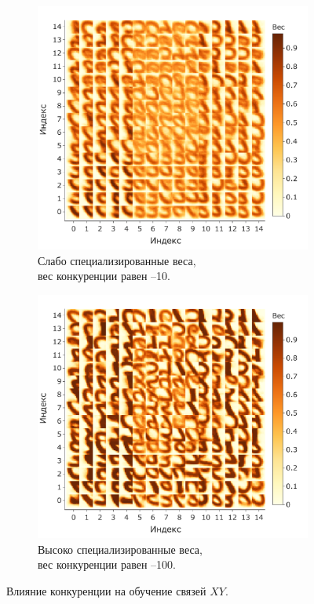 \documentclass[a4paper]{article}
\begin{document}
\begin{figure}[H]
\centering
\begin{subfigure}{0.45\textwidth}
    \includegraphics[width=\textwidth,keepaspectratio=true]{weights_XY_bad_ru.pdf}
    \caption{Слабо специализированные веса,\\ вес конкуренции равен --10.}
\end{subfigure}
\begin{subfigure}{0.45\textwidth}
    \includegraphics[width=\textwidth,keepaspectratio=true]{weights_XY_good_ru.pdf}
    \caption{Высоко специализированные веса,\\ вес конкуренции равен --100.}
\end{subfigure}
\caption{Влияние конкуренции на обучение связей $XY$.}
\label{competition-training-importance}
\end{figure}
\end{document}
